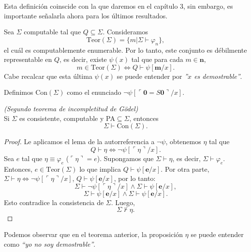 Esta definición coinscide con la que daremos en el capítulo 3, sin embargo, es importante señalarla ahora para los últimos resultados.

\begin{obs}
    Sea $\Sigma$ computable tal que $Q\subseteq\Sigma$. Consideramos
    \[\text{Teor}(\Sigma)=\{m|\Sigma\vdash\varphi_n\},\]
    el cuál es computablemente enumerable. Por lo tanto, este conjunto es débilmente representable en $Q$, es decir, existe $\psi(x)$ tal que para cada $m\in\mathbf{n}$,
    \[m\in\text{Teor}(\Sigma)\Longleftrightarrow Q\vdash\psi[\mathbf{m}/x].\]
    Cabe recalcar que esta última $\psi(x)$ se puede entender por \textit{''$x$ es demostrable''}.
\end{obs}
\begin{defn}
    Definimos Con$(\Sigma)$ como el enunciado $\neg\psi[\ulcorner\mathbf{0}=S\mathbf{0}\urcorner/x]$.
\end{defn}
\begin{thm} \textit{(Segundo teorema de incompletitud de Gödel)}\\
    Si $\Sigma$ es consistente, computable y PA$\subseteq\Sigma$, entonces
    \[\Sigma\vdash\text{Con}(\Sigma).\]
\end{thm}
\begin{proof}
    Le aplicamos el lema de la autorreferencia a $\neg\psi$, obtenemos $\eta$ tal que 
    \[Q\vdash\eta\Longleftrightarrow\neg\psi[\ulcorner\eta\urcorner/x].\]
    Sea $e$ tal que $\eta\equiv\varphi_e$ ($\ulcorner\eta\urcorner=e$). Supongamos que $\Sigma\vdash\eta$, es decir, $\Sigma\vdash\varphi_e$. Entonces, $e\in\text{Teor}(\Sigma)$ lo que implica $Q\vdash\psi[\mathbf{e}/x]$. Por otra parte, $\Sigma\vdash\eta\Longleftrightarrow\neg\psi[\ulcorner\eta\urcorner/x]$, $Q\vdash\psi[\mathbf{e}/x]$, por lo tanto:
    \[\Sigma\vdash\neg\psi[\ulcorner\eta\urcorner/x]\land\Sigma\vdash\psi[\mathbf{e}/x],\]
    \[\Sigma\vdash\psi[\mathbf{e}/x]\land\Sigma\vdash\psi[\mathbf{e}/x].\]
    Esto contradice la consistencia de $\Sigma$. Luego,
    \[\Sigma\not\vdash\eta.\]
\end{proof}
Podemos observar que en el teorema anterior, la proposición $\eta$ se puede entender como \textit{``yo no soy demostrable''}.
